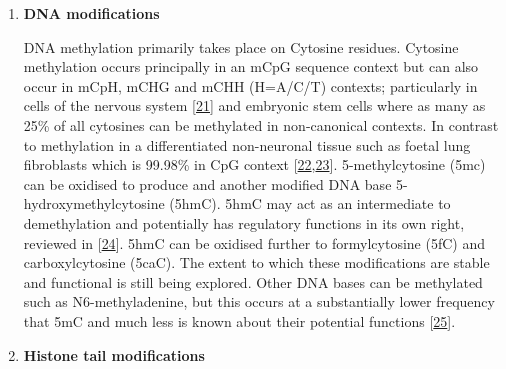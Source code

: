 \documentclass[
]{book}
\begin{document}
\begin{enumerate}
\def\labelenumi{\arabic{enumi}.}
\item
  \textbf{DNA modifications}

  DNA methylation primarily takes place on Cytosine residues.
  Cytosine methylation occurs principally in an mCpG sequence context but can also occur in mCpH, mCHG and mCHH (H=A/C/T) contexts; particularly in cells of the nervous system {[}\protect\hyperlink{ref-Guo2014a}{21}{]} and embryonic stem cells where as many as 25\% of all cytosines can be methylated in non-canonical contexts.
  In contrast to methylation in a differentiated non-neuronal tissue such as foetal lung fibroblasts which is 99.98\% in CpG context {[}\protect\hyperlink{ref-Lister2009}{22},\protect\hyperlink{ref-Schultz2015}{23}{]}.
  5-methylcytosine (5mc) can be oxidised to produce and another modified DNA base 5-hydroxymethylcytosine (5hmC).
  5hmC may act as an intermediate to demethylation and potentially has regulatory functions in its own right, reviewed in {[}\protect\hyperlink{ref-Pfeifer2013}{24}{]}.
  5hmC can be oxidised further to formylcytosine (5fC) and carboxylcytosine (5caC).
  The extent to which these modifications are stable and functional is still being explored.
  Other DNA bases can be methylated such as N6-methyladenine, but this occurs at a substantially lower frequency that 5mC and much less is known about their potential functions {[}\protect\hyperlink{ref-Wu2016}{25}{]}.
\item
  \textbf{Histone tail modifications}


\end{enumerate}
\end{document}
